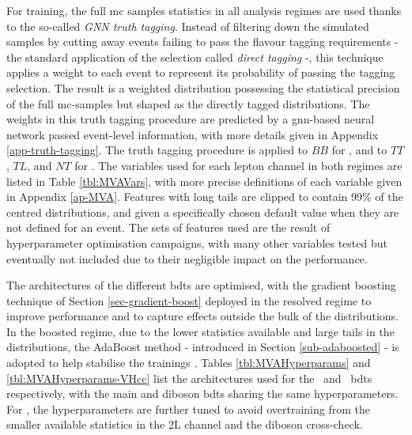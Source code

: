 For training, the full \gls{mc} samples statistics in all analysis regimes are used thanks to the so-called \textit{GNN truth tagging}. Instead of filtering down the simulated samples by cutting away events failing to pass the flavour tagging requirements - the standard application of the selection called \textit{direct tagging} -, this technique applies a weight to each event to represent its probability of passing the tagging selection. The result is a weighted distribution possessing the statistical precision of the full \gls{mc}-samples but shaped as the directly tagged distributions. The weights in this truth tagging procedure are predicted by a \gls{gnn}-based neural network passed event-level information, with more details given in Appendix \ref{app-truth-tagging}. The truth tagging procedure is applied to $BB$ for \vhb, and to $TT$, $TL$, and $NT$ for \vhc. The variables used for each lepton channel in both regimes are listed in Table \ref{tbl:MVAVars}, with more precise definitions of each variable given in Appendix \ref{ap-MVA}. Features with long tails are clipped to contain 99\% of the centred distributions, and given a specifically chosen default value when they are not defined for an event. The sets of features used are the result of hyperparameter optimisation campaigns, with many other variables tested but eventually not included due to their negligible impact on the performance. 



The architectures of the different \gls{bdt}s are optimised, with the gradient boosting technique of Section \ref{sec-gradient-boost} deployed in the resolved regime to improve performance and to capture effects outside the bulk of the distributions. In the boosted regime, due to the lower statistics available and large tails in the distributions, the AdaBoost method - introduced in Section \ref{sub-adaboosted} - is adopted to help stabilise the trainings \cite{Adaboost}. Tables \ref{tbl:MVAHyperparams} and \ref{tbl:MVAHyperparams-VHcc} list the architectures used for the \vhb\ and \vhc\ \gls{bdt}s respectively, with the main and diboson \gls{bdt}s sharing the same hyperparameters. For \vhc, the hyperparameters are further tuned to avoid overtraining from the smaller available statistics in the 2L channel and the diboson cross-check.



